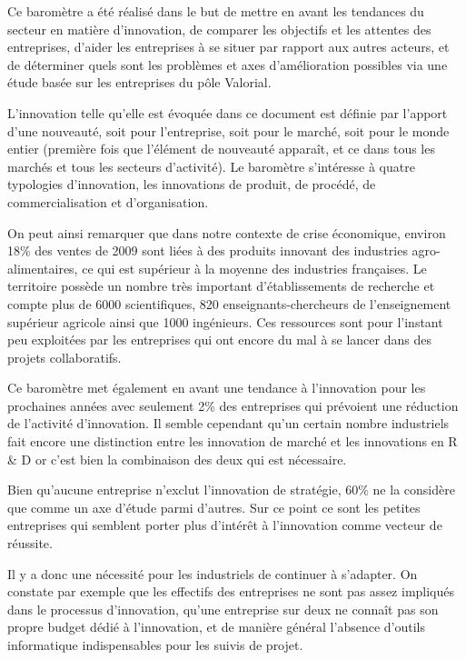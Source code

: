 \documentclass[a4paper,12pt]{report}
\begin{document}
    Ce baromètre a été réalisé dans le but de mettre en avant les tendances du secteur en matière d’innovation, de comparer les objectifs et les attentes des entreprises, d’aider les entreprises à se situer par rapport aux autres acteurs, et de déterminer quels sont les problèmes et axes d’amélioration possibles via une étude basée sur les entreprises du pôle Valorial.

    L’innovation telle qu’elle est évoquée dans ce document est définie par l’apport d’une nouveauté, soit pour l’entreprise, soit pour le marché, soit pour le monde entier (première fois que l’élément de nouveauté apparaît, et ce dans tous les marchés et tous les secteurs d’activité). Le baromètre s’intéresse à quatre typologies d’innovation, les innovations de produit, de procédé, de commercialisation et d’organisation.

    On peut ainsi remarquer que dans notre contexte de crise économique, environ 18\% des ventes de 2009 sont liées à des produits innovant des industries agro-alimentaires, ce qui est supérieur à la moyenne des industries françaises. Le territoire possède un nombre très important d’établissements de recherche et compte plus de 6000 scientifiques, 820 enseignants-chercheurs de l’enseignement supérieur agricole ainsi que 1000 ingénieurs. Ces ressources sont pour l’instant peu exploitées par les entreprises qui ont encore du mal à se lancer dans des projets collaboratifs.

    Ce baromètre met également en avant une tendance à l’innovation pour les prochaines années avec seulement 2\% des entreprises qui prévoient une réduction de l’activité d’innovation. Il semble cependant qu’un certain nombre industriels fait encore une distinction entre les innovation de marché et les innovations en R \& D or c’est bien la combinaison des deux qui est nécessaire.

    Bien qu’aucune entreprise n’exclut l’innovation de stratégie, 60\% ne la considère que comme un axe d’étude parmi d’autres. Sur ce point ce sont les petites entreprises qui semblent porter plus d’intérêt à l’innovation comme vecteur de réussite.

    Il y a donc une nécessité pour les industriels de continuer à s’adapter. On constate par exemple que les effectifs des entreprises ne sont pas assez impliqués dans le processus d’innovation, qu’une entreprise sur deux ne connaît pas son propre budget dédié à l’innovation, et de manière général l’absence d’outils informatique indispensables pour les suivis de projet.
\end{document}
